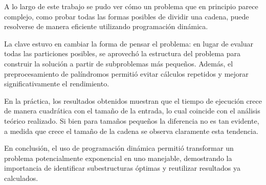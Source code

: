 A lo largo de este trabajo se pudo ver cómo un problema que en principio parece complejo, como probar todas las formas posibles de dividir una cadena, puede resolverse de manera eficiente utilizando programación dinámica.

La clave estuvo en cambiar la forma de pensar el problema: en lugar de evaluar todas las particiones posibles, se aprovechó la estructura del problema para construir la solución a partir de subproblemas más pequeños. Además, el preprocesamiento de palíndromos permitió evitar cálculos repetidos y mejorar significativamente el rendimiento.

En la práctica, los resultados obtenidos muestran que el tiempo de ejecución crece de manera cuadrática con el tamaño de la entrada, lo cual coincide con el análisis teórico realizado. Si bien para tamaños pequeños la diferencia no es tan evidente, a medida que crece el tamaño de la cadena se observa claramente esta tendencia.

En conclusión, el uso de programación dinámica permitió transformar un problema potencialmente exponencial en uno manejable, demostrando la importancia de identificar subestructuras óptimas y reutilizar resultados ya calculados.
